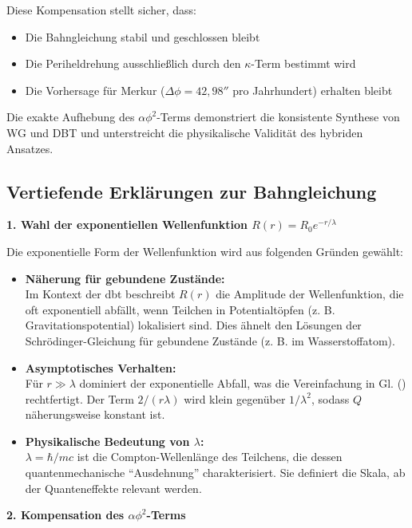 \noindent Diese Kompensation stellt sicher, dass:
\begin{itemize}
    \item Die Bahngleichung stabil und geschlossen bleibt
    \item Die Periheldrehung ausschließlich durch den $\kappa$-Term bestimmt wird
    \item Die Vorhersage für Merkur ($\Delta\phi = 42{,}98''$ pro Jahrhundert) erhalten bleibt
\end{itemize}

Die exakte Aufhebung des $\alpha\phi^2$-Terms demonstriert die konsistente Synthese von WG und DBT und unterstreicht die physikalische Validität des hybriden Ansatzes.

\subsection{Vertiefende Erklärungen zur Bahngleichung}
\textbf{1. Wahl der exponentiellen Wellenfunktion $R(r)=R_0 e^{-r/\lambda}$}

Die exponentielle Form der Wellenfunktion wird aus folgenden Gründen gewählt:
\begin{itemize}
    \item \textbf{Näherung für gebundene Zustände:}\\Im Kontext der \gls{dbt} beschreibt $R(r)$ die Amplitude der Wellenfunktion, die oft exponentiell abfällt, wenn Teilchen in Potentialtöpfen (z. B. Gravitationspotential) lokalisiert sind. Dies ähnelt den Lösungen der Schrödinger-Gleichung für gebundene Zustände (z. B. im Wasserstoffatom).
    \item \textbf{Asymptotisches Verhalten:}\\Für $r \gg \lambda$ dominiert der exponentielle Abfall, was die Vereinfachung in Gl. () rechtfertigt. Der Term $2/(r \lambda)$ wird klein gegenüber $1/\lambda^{2}$, sodass $Q$ näherungsweise konstant ist.
    \item \textbf{Physikalische Bedeutung von $\lambda$:}\\$\lambda=\hbar/mc$ ist die Compton-Wellenlänge des Teilchens, die dessen quantenmechanische \enquote{Ausdehnung} charakterisiert. Sie definiert die Skala, ab der Quanteneffekte relevant werden.
\end{itemize}

\textbf{2. Kompensation des $\alpha \phi^{2}$-Terms}

